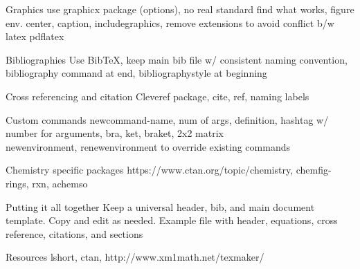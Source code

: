 \documentclass[11pt]{beamer}
\begin{document}
%
%
\begin{frame}{Graphics}
use graphicx package (options), no real standard find what works, figure env. center, caption, includegraphics, remove extensions to avoid conflict b/w latex pdflatex
\end{frame}

%
%
\begin{frame}{Bibliographies}
Use BibTeX, keep main bib file w/ consistent naming convention, bibliography command at end, bibliographystyle at beginning
\end{frame}

%
%
\begin{frame}{Cross referencing and citation}
Cleveref package, cite, ref, naming labels
\end{frame}

%
%
\begin{frame}{Custom commands}
newcommand-name, num of args, definition, hashtag w/ number for arguments, bra, ket, braket, 2x2 matrix \\
newenvironment, renewenvironment to override existing commands
\end{frame}

%
%
\begin{frame}{Chemistry specific packages}
https://www.ctan.org/topic/chemistry, chemfig-rings, rxn, achemso
\end{frame}

%
%
\begin{frame}{Putting it all together}
Keep a universal header, bib, and main document template. Copy and edit as needed. Example file with header, equations, cross reference, citations, and sections
\end{frame}

%
%
\begin{frame}{Resources}
lshort, ctan, http://www.xm1math.net/texmaker/
\end{frame}
\end{document}
